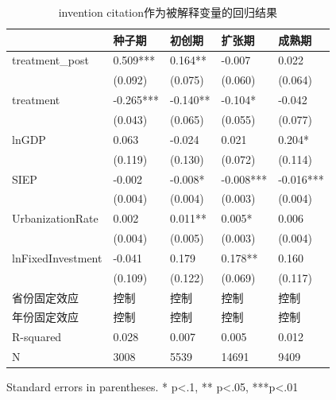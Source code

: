 \begin{table}
\caption{invention citation作为被解释变量的回归结果}
\label{}
\begin{center}
\begin{tabular}{lllll}
\hline
                  & 种子期       & 初创期      & 扩张期       & 成熟期        \\
\hline
treatment\_post   & 0.509***  & 0.164**  & -0.007    & 0.022      \\
                  & (0.092)   & (0.075)  & (0.060)   & (0.064)    \\
treatment         & -0.265*** & -0.140** & -0.104*   & -0.042     \\
                  & (0.043)   & (0.065)  & (0.055)   & (0.077)    \\
lnGDP             & 0.063     & -0.024   & 0.021     & 0.204*     \\
                  & (0.119)   & (0.130)  & (0.072)   & (0.114)    \\
SIEP            & -0.002    & -0.008*  & -0.008*** & -0.016***  \\
                  & (0.004)   & (0.004)  & (0.003)   & (0.004)    \\
UrbanizationRate              & 0.002     & 0.011**  & 0.005*    & 0.006      \\
                  & (0.004)   & (0.005)  & (0.003)   & (0.004)    \\
lnFixedInvestment & -0.041    & 0.179    & 0.178**   & 0.160      \\
                  & (0.109)   & (0.122)  & (0.069)   & (0.117)    \\
省份固定效应  & 控制 & 控制 & 控制 & 控制  \\ 
 年份固定效应  & 控制 & 控制 & 控制 & 控制  \\ 
\hline

R-squared         & 0.028     & 0.007    & 0.005     & 0.012      \\
N                 & 3008      & 5539     & 14691     & 9409       \\
\hline
\end{tabular}
\end{center}
\end{table}
\bigskip
Standard errors in parentheses. \newline 
* p<.1, ** p<.05, ***p<.01

